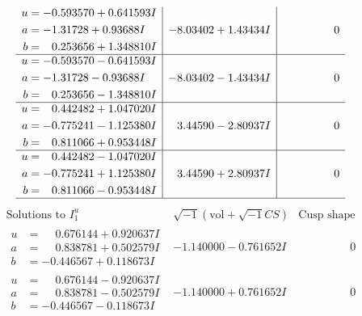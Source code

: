 \documentclass[1p]{elsarticle_modified}
\theoremstyle{definition}
\newcommand{\I}{\sqrt{-1}}
\begin{document}
$$\begin{array}{c|c|c}
\begin{aligned}
u &= -0.593570 + 0.641593 I \\
a &= -1.31728 + 0.93688 I \\
b &= \phantom{-}0.253656 + 1.348810 I\end{aligned}
 & -8.03402 + 1.43434 I & \phantom{-0.000000 } 0 \\ \hline\begin{aligned}
u &= -0.593570 - 0.641593 I \\
a &= -1.31728 - 0.93688 I \\
b &= \phantom{-}0.253656 - 1.348810 I\end{aligned}
 & -8.03402 - 1.43434 I & \phantom{-0.000000 } 0 \\ \hline\begin{aligned}
u &= \phantom{-}0.442482 + 1.047020 I \\
a &= -0.775241 - 1.125380 I \\
b &= \phantom{-}0.811066 + 0.953448 I\end{aligned}
 & \phantom{-}3.44590 - 2.80937 I & \phantom{-0.000000 } 0 \\ \hline\begin{aligned}
u &= \phantom{-}0.442482 - 1.047020 I \\
a &= -0.775241 + 1.125380 I \\
b &= \phantom{-}0.811066 - 0.953448 I\end{aligned}
 & \phantom{-}3.44590 + 2.80937 I & \phantom{-0.000000 } 0\\
 \hline 
 \end{array}$$\newpage$$\begin{array}{c|c|c}  
\text{Solutions to }I^u_{1}& \I (\text{vol} + \sqrt{-1}CS) & \text{Cusp shape}\\
 \hline 
\begin{aligned}
u &= \phantom{-}0.676144 + 0.920637 I \\
a &= \phantom{-}0.838781 + 0.502579 I \\
b &= -0.446567 + 0.118673 I\end{aligned}
 & -1.140000 - 0.761652 I & \phantom{-0.000000 } 0 \\ \hline\begin{aligned}
u &= \phantom{-}0.676144 - 0.920637 I \\
a &= \phantom{-}0.838781 - 0.502579 I \\
b &= -0.446567 - 0.118673 I\end{aligned}
 & -1.140000 + 0.761652 I & \phantom{-0.000000 } 0 \\ \hline\begin{aligned}

\end{aligned}
\end{array}$$
\end{document}
